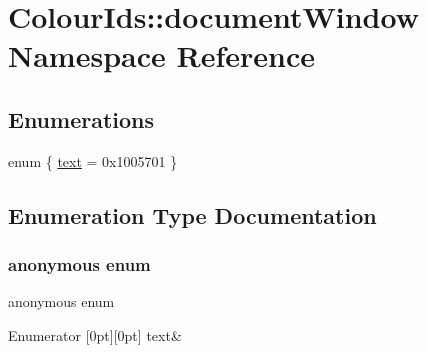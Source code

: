 \hypertarget{namespaceColourIds_1_1documentWindow}{}\section{Colour\+Ids\+:\+:document\+Window Namespace Reference}
\label{namespaceColourIds_1_1documentWindow}
\subsection*{Enumerations}
\begin{DoxyCompactItemize}
\item 
enum \{ \mbox{\hyperlink{namespaceColourIds_1_1documentWindow_abcba487a27fed69008ee5f87b37c529da736507be49c426ecb8a8bcc6b3af5a2d}{text}} = 0x1005701
 \}
\end{DoxyCompactItemize}


\subsection{Enumeration Type Documentation}
\mbox{\label{namespaceColourIds_1_1documentWindow_abcba487a27fed69008ee5f87b37c529d}} 
\subsubsection{\texorpdfstring{anonymous enum}{anonymous enum}}
{\footnotesize\ttfamily anonymous enum}

\begin{DoxyEnumFields}{Enumerator}
[0pt][0pt]{}\mbox{\label{namespaceColourIds_1_1documentWindow_abcba487a27fed69008ee5f87b37c529da736507be49c426ecb8a8bcc6b3af5a2d}} 
text&\\
\hline

\end{DoxyEnumFields}
